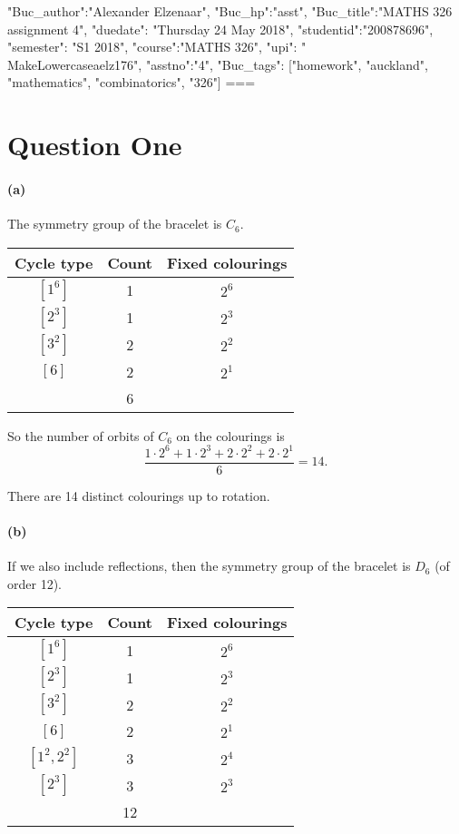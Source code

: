 {"Buc_author":"Alexander Elzenaar", "Buc_hp":"asst",
 "Buc_title":"MATHS 326 assignment 4",
 "duedate": "Thursday 24 May 2018", "studentid":"200878696",
 "semester": "S1 2018", "course":"MATHS 326", "upi": "\\MakeLowercase{aelz176}",
 "asstno":"4", "Buc_tags": ["homework", "auckland", "mathematics", "combinatorics", "326"]}
===
\section*{Question One}
\paragraph{(a)}
The symmetry group of the bracelet is $ C_6 $.
\begin{center}\begin{tabular}{|c|c|c|}\hline
  \textbf{Cycle type} & \textbf{Count} & \textbf{Fixed colourings}\\\hline
  $[1^6]$ & 1 & $ 2^6 $\\
  $[2^3]$ & 1 & $ 2^3 $\\
  $[3^2]$ & 2 & $ 2^2 $\\
  $[6]$ & 2 & $ 2^1 $\\\hline
   & 6 &\\\hline
\end{tabular}\end{center}

So the number of orbits of $ C_6 $ on the colourings is
\begin{displaymath}
  \frac{1 \cdot 2^6 + 1 \cdot 2^3 + 2 \cdot 2^2 + 2 \cdot 2^1}{6} = 14.
\end{displaymath}

There are 14 distinct colourings up to rotation.

\paragraph{(b)}
If we also include reflections, then the symmetry group of the bracelet is $ D_6 $ (of order 12).
\begin{center}\begin{tabular}{|c|c|c|}\hline
  \textbf{Cycle type} & \textbf{Count} & \textbf{Fixed colourings}\\\hline
  $[1^6]$ & 1 & $ 2^6 $\\
  $[2^3]$ & 1 & $ 2^3 $\\
  $[3^2]$ & 2 & $ 2^2 $\\
  $[6]$ & 2 & $ 2^1 $\\\hline
  $[1^2,2^2] $ & 3 & $ 2^4 $\\
  $[2^3] $ & 3 & $ 2^3 $\\\hline
   & 12 &\\\hline
\end{tabular}\end{center}

